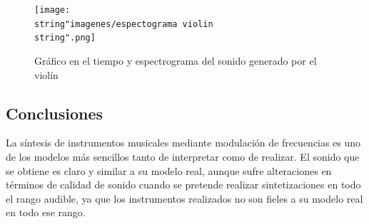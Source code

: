 \documentclass[../ASSD_TP2.tex]{subfiles}
\begin{document}
\begin{figure}[H]

\begin{centering}
\texttt{[image: \\string"imagenes/espectograma violin\\string".png]}\caption{Gráfico en el tiempo y espectrograma del sonido generado por el violín}
\par\end{centering}
\end{figure}

\subsection{Conclusiones}
La síntesis de instrumentos musicales mediante modulación de frecuencias es uno de los modelos más sencillos tanto de interpretar como de realizar. El sonido que se obtiene es claro y similar a su modelo real, aunque sufre alteraciones en términos de calidad de sonido cuando se pretende realizar sintetizaciones en todo el rango audible, ya que los instrumentos realizados no son fieles a su modelo real en todo ese rango.  
\end{document}
